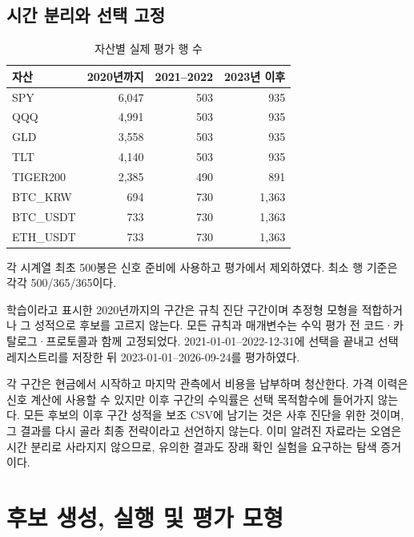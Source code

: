 \documentclass[11pt,a4paper]{article}
\begin{document}
\subsection{시간 분리와 선택 고정}
\begin{table}[htbp]\centering
\small
\setlength{\tabcolsep}{4pt}
\caption{자산별 실제 평가 행 수}
\begin{tabular}{lrrr}
\toprule
자산 & 2020년까지 & 2021--2022 & 2023년 이후 \\
\midrule
SPY & 6,047 & 503 & 935 \\
QQQ & 4,991 & 503 & 935 \\
GLD & 3,558 & 503 & 935 \\
TLT & 4,140 & 503 & 935 \\
TIGER200 & 2,385 & 490 & 891 \\
BTC\_KRW & 694 & 730 & 1,363 \\
BTC\_USDT & 733 & 730 & 1,363 \\
ETH\_USDT & 733 & 730 & 1,363 \\
\bottomrule
\end{tabular}
\par\smallskip\begin{minipage}{\linewidth}\footnotesize 각 시계열 최초 500봉은 신호 준비에 사용하고 평가에서 제외하였다. 최소 행 기준은 각각 500/365/365이다.\end{minipage}
\end{table}
학습이라고 표시한 2020년까지의 구간은 규칙 진단 구간이며 추정형 모형을 적합하거나 그 성적으로 후보를 고르지 않는다. 모든 규칙과 매개변수는 수익 평가 전 코드·카탈로그·프로토콜과 함께 고정되었다. 2021-01-01--2022-12-31에 선택을 끝내고 선택 레지스트리를 저장한 뒤 2023-01-01--2026-09-24를 평가하였다.

각 구간은 현금에서 시작하고 마지막 관측에서 비용을 납부하며 청산한다. 가격 이력은 신호 계산에 사용할 수 있지만 이후 구간의 수익률은 선택 목적함수에 들어가지 않는다. 모든 후보의 이후 구간 성적을 보조 CSV에 남기는 것은 사후 진단을 위한 것이며, 그 결과를 다시 골라 최종 전략이라고 선언하지 않는다. 이미 알려진 자료라는 오염은 시간 분리로 사라지지 않으므로, 유의한 결과도 장래 확인 실험을 요구하는 탐색 증거이다.

\section{후보 생성, 실행 및 평가 모형}
\end{document}
